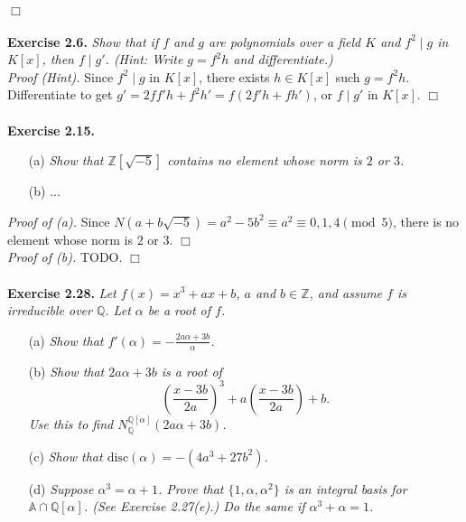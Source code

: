 \documentclass{article}
\begin{document}
$\Box$ \\\\






\textbf{Exercise 2.6.}
\emph{Show that if $f$ and $g$ are polynomials over a field $K$ and
$f^2 \mid g$ in $K[x]$, then $f \mid g'$.
(Hint: Write $g = f^2 h$ and differentiate.)} \\

\emph{Proof (Hint).}
Since $f^2 \mid g$ in $K[x]$, there exists $h \in K[x]$ such $g = f^2 h$.
Differentiate to get $g' = 2f f' h + f^2 h' = f(2f'h + fh')$,
or $f \mid g'$ in $K[x]$.
$\Box$ \\\\






\textbf{Exercise 2.15.}
\begin{enumerate}
\item[(a)]
\emph{Show that $\mathbb{Z}[\sqrt{-5}]$ contains no element whose norm is $2$ or $3$.}
\item[(b)]
...\\
\end{enumerate}

\emph{Proof of (a).}
Since $N(a+b\sqrt{-5}) = a^2 - 5b^2 \equiv a^2 \equiv 0,1,4 \pmod{5}$,
there is no element whose norm is $2$ or $3$.
$\Box$ \\

\emph{Proof of (b).}
TODO.
$\Box$ \\\\






\textbf{Exercise 2.28.}
\emph{Let $f(x) = x^3+ax+b$, $a$ and $b \in \mathbb{Z}$,
and assume $f$ is irreducible over $\mathbb{Q}$.
Let $\alpha$ be a root of $f$.}
\begin{enumerate}
\item[(a)]
\emph{Show that $f'(\alpha) = -\frac{2a\alpha+3b}{\alpha}$.}
\item[(b)]
\emph{Show that $2a\alpha+3b$ is a root of
$$\left( \frac{x-3b}{2a} \right)^3 + a\left( \frac{x-3b}{2a} \right) + b.$$
Use this to find $N_{\mathbb{Q}}^{\mathbb{Q}[\alpha]} (2a\alpha+3b)$.}
\item[(c)]
\emph{Show that $\text{disc}(\alpha) = -(4a^3+27b^2)$.}
\item[(d)]
\emph{Suppose $\alpha^3=\alpha+1$.
Prove that $\{1,\alpha,\alpha^2\}$ is an integral basis for $\mathbb{A}\cap\mathbb{Q}[\alpha]$.
(See Exercise 2.27(e).)
Do the same if $\alpha^3+\alpha=1$.} \\
\end{enumerate}
\end{document}
